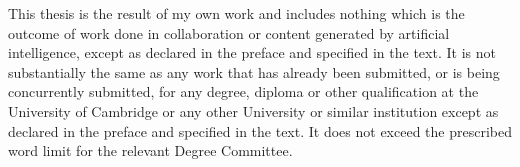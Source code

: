 
\begin{declaration*}

This thesis is the result of my own work and includes nothing which is the outcome of work done in collaboration or content generated by artificial intelligence, except as declared in the preface and specified in the text. It is not substantially the same as any work that has already been submitted, or is being concurrently submitted, for any degree, diploma or other qualification at the University of Cambridge or any other University or similar institution except as declared in the preface and specified in the text. It does not exceed the prescribed word limit for the relevant Degree Committee.

\end{declaration*}
